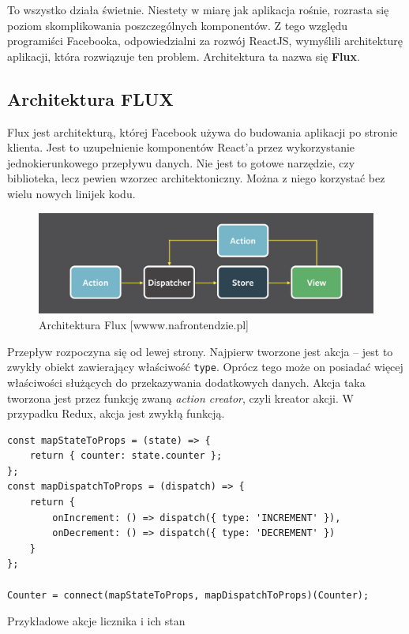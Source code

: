 To wszystko działa świetnie. Niestety w miarę jak aplikacja rośnie,
rozrasta się poziom skomplikowania poszczególnych komponentów.
Z tego względu programiści Facebooka, odpowiedzialni za rozwój ReactJS, wymyślili
architekturę aplikacji, która rozwiązuje ten problem.
Architektura ta nazwa się \textbf{Flux}.
~\cite{www_nafrontendzie}

\subsection{Architektura FLUX}

Flux jest architekturą, której Facebook używa do budowania aplikacji po stronie klienta.
Jest to uzupełnienie komponentów React’a przez wykorzystanie jednokierunkowego przepływu danych.
Nie jest to gotowe narzędzie, czy biblioteka, lecz pewien wzorzec architektoniczny.
Można z niego korzystać bez wielu nowych linijek kodu.

\begin{figure}
	\centering\includegraphics[width=.6\textwidth]{img/flux}
	\caption{Architektura Flux [wwww.nafrontendzie.pl]}\label{rys:flux}%
\end{figure}

Przepływ rozpoczyna się od lewej strony.
Najpierw tworzone jest akcja – jest to zwykły obiekt zawierający właściwość \texttt{type}.
Oprócz tego może on posiadać więcej właściwości służących do przekazywania dodatkowych danych.
Akcja taka tworzona jest przez funkcję zwaną \textit{action creator}, czyli kreator akcji.
W przypadku Redux, akcja jest zwykłą funkcją.

\begin{listing}
\begin{verbatim}
const mapStateToProps = (state) => {
    return { counter: state.counter };
};
const mapDispatchToProps = (dispatch) => {
    return {
        onIncrement: () => dispatch({ type: 'INCREMENT' }),
        onDecrement: () => dispatch({ type: 'DECREMENT' })
    }
};

Counter = connect(mapStateToProps, mapDispatchToProps)(Counter);
\end{verbatim}
\caption{Przykładowe akcje licznika i ich stan} \label{listing:licznik}
\end{listing}

